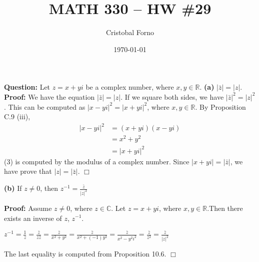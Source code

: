 \documentclass[12pt]{article}
\title{MATH 330 -- HW \#29}
\author{Cristobal Forno}
\date{\today}
\begin{document}
\maketitle

\textbf{Question:} Let $z = x + yi$ be a complex number, where $x, y \in
\mathbb{R}$.
\newline
\textbf{(a)} $|\bar{z}| = |z|$.
\newline
\indent
\textbf{Proof:} We have the equation $|\bar{z}| = |z|$. If we square both sides,
we have $|\bar{z}|^2 = |z|^2$. This can be computed as $|x-yi|^2 = |x+yi|^2$,
where $x, y \in \mathbb{R}$. By Proposition C.9 (iii),
\begin{align}
  |x-yi|^2 &= (x+yi)(x-yi) \\
           &= x^2 + y^2 \\
           &= |x+yi|^2 
\end{align}
(3) is computed by the modulus of a complex number. Since $|x+yi| = |\bar{z}|$, we have prove
that $|z| = |\bar{z}|$. $\Box$


\noindent
\textbf{(b)} If $z \neq 0$, then $z^{-1} = \frac{\bar{z}}{|z|^2}$

\textbf{Proof:} Assume $z \neq 0$, where $z \in \mathbb{C}$. Let $z = x + yi$,
where $x, y \in \mathbb{R}$.Then there exists
an inverse of $z$, $z^{-1}$.
\begin{center}
$z^{-1} = \frac{1}{z} = \frac{\bar{z}}{z\bar{z}} = \frac{\bar{z}}{x^2+y^2} =
\frac{\bar{z}}{x^2 +(-1)y^2} =  \frac{\bar{z}}{x^2- y^2i^2} =
\frac{\bar{z}}{z^2} = \frac{\bar{z}}{|z|^2}$
\end{center}

The last equality is computed from Proposition 10.6. $\Box$
\end{document}
